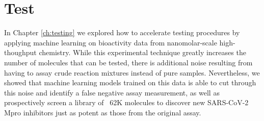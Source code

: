 \section*{Test}
In Chapter \ref{ch:testing} we explored how to accelerate testing procedures by applying machine learning on bioactivity data from nanomolar-scale high-thoughput chemistry. While this experimental technique greatly increases the number of molecules that can be tested, there is additional noise resulting from having to assay crude reaction mixtures instead of pure samples. Nevertheless, we showed that machine learning models trained on this data is able to cut through this noise and identify a false negative assay measurement, as well as prospectively screen a library of ~62K molecules to discover new SARS-CoV-2 Mpro inhibitors just as potent as those from the original assay.

